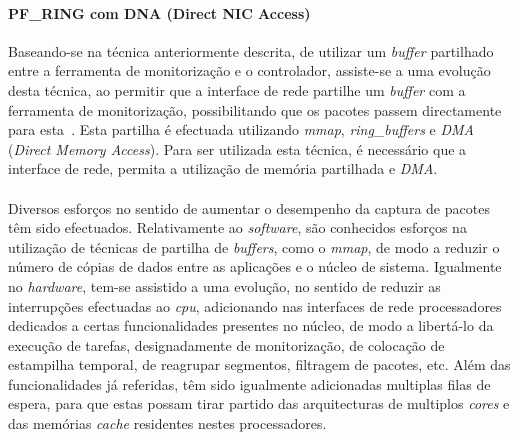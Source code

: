 \paragraph*{PF\_RING com DNA (Direct NIC Access)}
Baseando-se na técnica anteriormente descrita, de utilizar um \textit{buffer} partilhado entre a ferramenta de monitorização e o controlador, assiste-se a uma evolução desta técnica, ao permitir que a interface de rede partilhe um \textit{buffer} com a ferramenta de monitorização, possibilitando que os pacotes passem directamente para esta~\cite{IntroPF_RIDNADirecNICAcces}.
Esta partilha é efectuada utilizando \textit{mmap}, \textit{ring\_buffers} e \textit{DMA} (\textit{Direct Memory Access}).
Para ser utilizada esta técnica, é necessário que a interface de rede, permita a utilização de memória partilhada e \textit{DMA}.

\paragraph*{}

Diversos esforços no sentido de aumentar o desempenho da captura de pacotes têm sido efectuados.
Relativamente ao \textit{software}, são conhecidos esforços na utilização de técnicas de partilha de \textit{buffers}, como o \textit{mmap}, de modo a reduzir o número de cópias de dados entre as aplicações e o núcleo de sistema.
Igualmente no \textit{hardware}, tem-se assistido a uma evolução, no sentido de reduzir as interrupções efectuadas ao \textit{cpu}, adicionando nas interfaces de rede processadores dedicados a certas funcionalidades presentes no núcleo, de modo a libertá-lo da execução de tarefas, designadamente de monitorização, de colocação de estampilha temporal, de reagrupar segmentos, filtragem de pacotes, etc.
Além das funcionalidades já referidas, têm sido igualmente adicionadas multiplas filas de espera, para que estas possam tirar partido das arquitecturas de multiplos \textit{cores} e das memórias \textit{cache} residentes nestes processadores.


%
%
%
%
%



